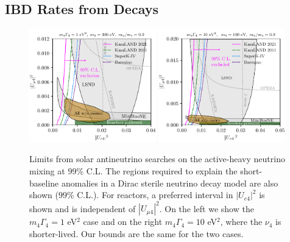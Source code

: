 \documentclass[
reprint,
superscriptaddress,
showpacs,
preprintnumbers,
nofootinbib,
nobibnotes,
amsmath,
amssymb, 
aps,
prd,
floatfix
]{revtex4-1}
\begin{document}
\subsection{IBD Rates from Decays} 
%
\begin{figure}[t]
    \centering
    \includegraphics[width=0.49\textwidth]{limits_MN_300_MB_270.pdf}
    \includegraphics[width=0.49\textwidth]{limits_MN_300_MB_270_v2.pdf}
\caption{\label{fig:limits}Limits from solar antineutrino searches on the active-heavy neutrino mixing at $99\%$ C.L. The regions required to explain the short-baseline anomalies in a Dirac sterile neutrino decay model are also shown ($99\%$ C.L.). For reactors, a preferred interval in $|U_{e4}|^2$ is shown and is independent of $|U_{\mu 4}|^2$. On the left we show the $m_4 \Gamma_4 = 1$ eV$^2$ case and on the right $m_4 \Gamma_4 = 10$ eV$^2$, where the $\nu_4$ is shorter-lived. Our bounds are the same for the two cases.}
\end{figure}
\end{document}
